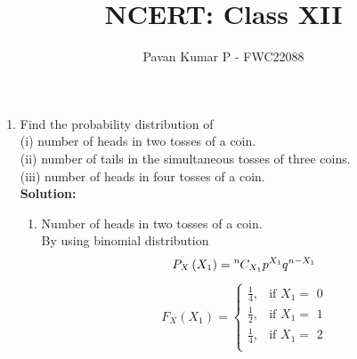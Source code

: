 \documentclass{article}
\providecommand{\brak}[1]{\ensuremath{\left(#1\right)}}
\newcommand{\solution}{\noindent \textbf{Solution: }}
\newcommand*{\permcomb}[4][0mu]{{{}^{#3}\mkern#1#2_{#4}}}
\newcommand*{\comb}[1][-1mu]{\permcomb[#1]{C}}
\begin{document}
\title{NCERT: Class XII}
\author{\Large Pavan Kumar P - FWC22088}
\date{}

\maketitle

\begin{enumerate}[label=13.\arabic{enumi}.\arabic{enumii}]

\setcounter{enumi}{3}
\setcounter{enumii}{4}

\item Find the probability distribution of\\
(i) number of heads in two tosses of a coin.\\
(ii) number of tails in the simultaneous tosses of three coins.\\
(iii) number of heads in four tosses of a coin.\\[1ex]
\solution
\begin{enumerate} 

\begin{table}[h]
 \centering
	
	\caption{Variable Description }
\end{table}
\item Number of heads in two tosses of a coin.\\
 By using binomial distribution
 \begin{align}
P_X\brak{X_1} = \comb{n}{X_1}p^{X_1}q^{n-X_1}
 \end{align}
\begin{align}
  F_X(X_1) =
    \begin{cases}
      \frac{1}{4},  & \text{if $X_1 =$ 0}\\
      \frac{1}{2}, & \text{if  $X_1 =$ 1}\\
      \frac{1}{4}, & \text{if  $X_1 =$ 2}\\
    \end{cases}       
\end{align}


\end{enumerate}
\end{enumerate}
\end{document}
